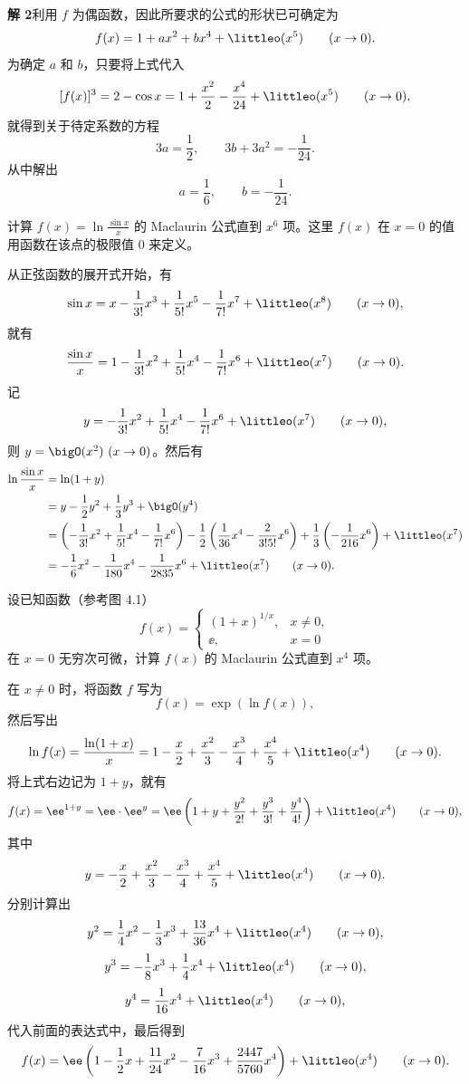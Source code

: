 \begin{xsolution}
\textbf{解 2}\quad 利用 $f$ 为偶函数，因此所要求的公式的形状已可确定为
\[
  f(x)=1+ax^2+bx^4+\littleo(x^5)\qquad(x\to0).
\]
为确定 $a$ 和 $b$，只要将上式代入
\[
  [f(x)]^3=2-\cos x=1+\frac{x^2}{2}-\frac{x^4}{24}+\littleo(x^5)\qquad(x\to0),
\]
就得到关于待定系数的方程
\[
  3a=\frac12,\qquad 3b+3a^2=-\frac{1}{24}.
\]
从中解出
\[
  a=\frac16,\qquad b=-\frac{1}{24}.
\]
\end{xsolution}

\begin{xexample}[7.2.3]
计算 $f(x)=\ln\frac{\sin x}{x}$ 的 Maclaurin 公式直到 $x^6$ 项。这里 $f(x)$ 在 $x=0$ 的值用函数在该点的极限值 0 来定义。
\end{xexample}
\begin{xsolution}
从正弦函数的展开式开始，有
\[
  \sin x=x-\frac{1}{3!}x^3+\frac{1}{5!}x^5-\frac{1}{7!}x^7+\littleo(x^8)\qquad(x\to0),
\]
就有
\[
  \frac{\sin x}{x}=1-\frac{1}{3!}x^2+\frac{1}{5!}x^4-\frac{1}{7!}x^6+\littleo(x^7)\qquad(x\to0).
\]
记
\[
  y=-\frac{1}{3!}x^2+\frac{1}{5!}x^4-\frac{1}{7!}x^6+\littleo(x^7)\qquad(x\to0),
\]
则 $y=\bigO(x^2)\ (x\to0)$。然后有
\[
  \begin{aligned}
  \ln\frac{\sin x}{x}
  &=\ln(1+y)\\
  &=y-\frac12y^2+\frac13y^3+\bigO(y^4)\\
  &=\left(-\frac{1}{3!}x^2+\frac{1}{5!}x^4-\frac{1}{7!}x^6\right)
    -\frac12\left(\frac{1}{36}x^4-\frac{2}{3!5!}x^6\right)
    +\frac13\left(-\frac{1}{216}x^6\right)+\littleo(x^7)\\
  &=-\frac16x^2-\frac{1}{180}x^4-\frac{1}{2835}x^6+\littleo(x^7)\qquad(x\to0).
  \end{aligned}
\]
\end{xsolution}

\begin{xexample}[7.2.4]
设已知函数（参考图 4.1）
\[
  f(x)=
  \begin{cases}
    (1+x)^{1/x},&x\neq0,\\
    \ee,&x=0
  \end{cases}
\]
在 $x=0$ 无穷次可微，计算 $f(x)$ 的 Maclaurin 公式直到 $x^4$ 项。
\end{xexample}
\begin{xsolution}
在 $x\neq0$ 时，将函数 $f$ 写为
\[
  f(x)=\exp(\ln f(x)),
\]
然后写出
\[
  \ln f(x)=\frac{\ln(1+x)}{x}=1-\frac{x}{2}+\frac{x^2}{3}-\frac{x^3}{4}+\frac{x^4}{5}+\littleo(x^4)\qquad(x\to0).
\]
将上式右边记为 $1+y$，就有
\[
  f(x)=\ee^{1+y}=\ee\cdot\ee^y
  =\ee\left(1+y+\frac{y^2}{2!}+\frac{y^3}{3!}+\frac{y^4}{4!}\right)+\littleo(x^4)\qquad(x\to0),
\]
其中
\[
  y=-\frac{x}{2}+\frac{x^2}{3}-\frac{x^3}{4}+\frac{x^4}{5}+\littleo(x^4)\qquad(x\to0).
\]
分别计算出
\[
  y^2=\frac14x^2-\frac13x^3+\frac{13}{36}x^4+\littleo(x^4)\qquad(x\to0),
\]
\[
  y^3=-\frac18x^3+\frac14x^4+\littleo(x^4)\qquad(x\to0),
\]
\[
  y^4=\frac{1}{16}x^4+\littleo(x^4)\qquad(x\to0),
\]
代入前面的表达式中，最后得到
\[
  f(x)=\ee\left(1-\frac12x+\frac{11}{24}x^2-\frac{7}{16}x^3+\frac{2447}{5760}x^4\right)+\littleo(x^4)\qquad(x\to0).
\]
\end{xsolution}

